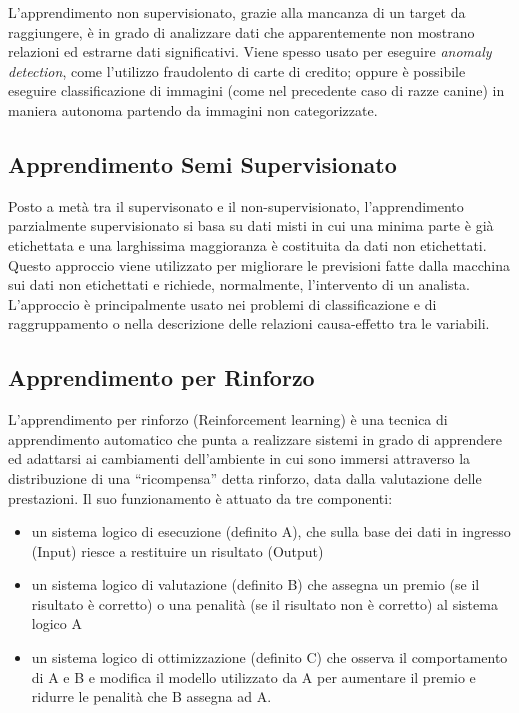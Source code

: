 L'apprendimento non supervisionato, grazie alla mancanza di un target da raggiungere, è in grado di analizzare dati che   apparentemente non mostrano relazioni ed estrarne dati significativi. Viene spesso usato per eseguire \textit{anomaly detection}, come l'utilizzo fraudolento di carte di credito; oppure è possibile eseguire classificazione di immagini (come nel precedente caso di razze canine) in maniera autonoma partendo da immagini non categorizzate.

\subsection{Apprendimento Semi Supervisionato}
Posto a metà tra il supervisonato e il non-supervisionato, l'apprendimento parzialmente supervisionato si basa su dati misti in cui una minima parte è già etichettata e una larghissima maggioranza è costituita da dati non etichettati.  Questo approccio viene utilizzato per migliorare le previsioni fatte dalla macchina sui dati non etichettati e richiede, normalmente, l'intervento di un analista. L'approccio è principalmente usato nei problemi di classificazione e di raggruppamento o nella descrizione delle relazioni causa-effetto tra le variabili.

\subsection{Apprendimento per Rinforzo}
L'apprendimento per rinforzo (Reinforcement learning) è una tecnica di apprendimento automatico che punta a realizzare sistemi in grado di apprendere ed adattarsi ai cambiamenti dell'ambiente in cui sono immersi attraverso la distribuzione di una “ricompensa” detta rinforzo, data dalla valutazione delle prestazioni.
Il suo funzionamento è attuato da tre componenti:
\begin{itemize}
\item un sistema logico di esecuzione (definito A), che sulla base dei dati in ingresso (Input) riesce a restituire un risultato (Output)
\item un sistema logico di valutazione (definito B) che assegna un premio (se il risultato è corretto) o una penalità (se il risultato non è corretto) al sistema logico A
\item un sistema logico di ottimizzazione (definito C) che osserva il comportamento di A e B e modifica il modello utilizzato da A per aumentare il premio e ridurre le penalità che B assegna ad A.
\end{itemize}

